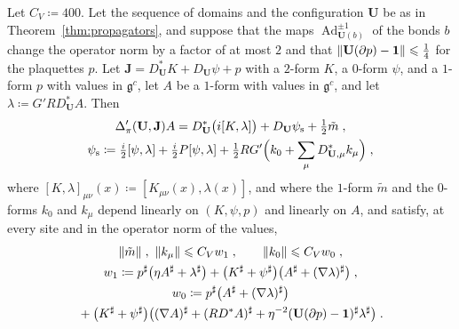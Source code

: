 \documentclass[11pt]{preprint}
\newcommand{\id}{\mathbf 1}
\newcommand{\Ad}{\operatorname{Ad}}
\DeclarePairedDelimiter{\norm}{\lVert}{\rVert}
\numberwithin{equation}{section}
\begin{document}
\begin{lemma}\label{lem:vertex}
Let $C_V \coloneqq 400$. Let the sequence of domains and the configuration $\mathbf U$ be as in Theorem~\ref{thm:propagators}, and suppose that the maps $\Ad_{\mathbf U(b)}^{\pm1}$ of the bonds $b$ change the operator norm by a factor of at most $2$ and that $\norm{\mathbf U(\partial p) - \id} \leqslant \frac{1}{4}$ for the plaquettes $p$. Let $\mathbf J = D^*_{\mathbf U}K + D_{\mathbf U}\psi + p$ with a $2$-form $K$, a $0$-form $\psi$, and a $1$-form $p$ with values in $\mathfrak g^c$, let $A$ be a $1$-form with values in $\mathfrak g^c$, and let $\lambda \coloneqq G'RD^*_{\mathbf U}A$. Then
\begin{equation}\label{eq:vertex}
\begin{gathered}
    \Delta'_\pi(\mathbf U, \mathbf J)A = D^*_{\mathbf U}\bigl(i[K, \lambda]\bigr) + D_{\mathbf U}\psi_{\mathrm s} + \tfrac{1}{2}\tilde m\;,\\
    \psi_{\mathrm s} \coloneqq \tfrac{i}{2}[\psi, \lambda] + \tfrac{i}{2}P[\psi, \lambda] + \tfrac{1}{2}RG'\Bigl(k_0 + \sum_\mu D^*_{\mathbf U,\mu}k_\mu\Bigr)\;,
\end{gathered}
\end{equation}
where $[K, \lambda]_{\mu\nu}(x) \coloneqq [K_{\mu\nu}(x), \lambda(x)]$, and where the $1$-form $\tilde m$ and the $0$-forms $k_0$ and $k_\mu$ depend linearly on $(K, \psi, p)$ and linearly on $A$, and satisfy, at every site and in the operator norm of the values,
\begin{equation}\label{eq:vertex-weights}
\begin{gathered}
    \norm{\tilde m}\;,\ \norm{k_\mu} \leqslant C_Vw_1\;,
    \qquad
    \norm{k_0} \leqslant C_Vw_0\;,\\
    w_1 \coloneqq p^\sharp\bigl(\eta A^\sharp + \lambda^\sharp\bigr) + \bigl(K^\sharp + \psi^\sharp\bigr)\bigl(A^\sharp + (\nabla\lambda)^\sharp\bigr)\;,\\
    w_0 \coloneqq p^\sharp\bigl(A^\sharp + (\nabla\lambda)^\sharp\bigr)\\
    {} + \bigl(K^\sharp + \psi^\sharp\bigr)\bigl((\nabla A)^\sharp + (RD^*A)^\sharp + \eta^{-2}(\mathbf U(\partial p) - \id)^\sharp\lambda^\sharp\bigr)\;.
\end{gathered}
\end{equation}
\end{lemma}
\end{document}
